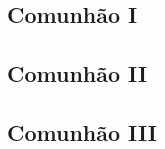 \AllowPageFlush

\subsection{Comunhão I}\label{subsection:liturgia-defunctorum/missa-pro-defunctis/communio-1}

\subsection{Comunhão II}\label{subsection:liturgia-defunctorum/missa-pro-defunctis/communio-2}

\AllowPageFlush

\subsection{Comunhão III}\label{subsection:liturgia-defunctorum/missa-pro-defunctis/communio-3}
